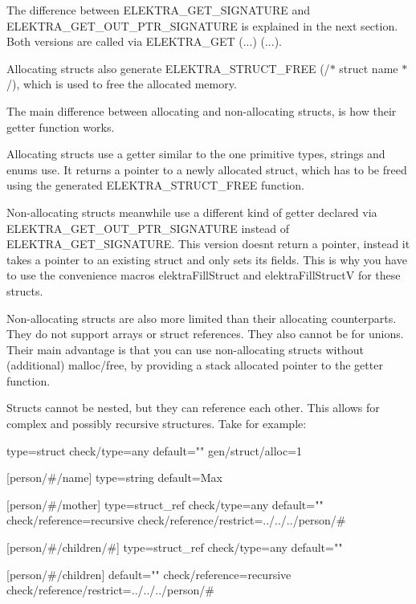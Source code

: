 The difference between {\ttfamily E\+L\+E\+K\+T\+R\+A\+\_\+\+G\+E\+T\+\_\+\+S\+I\+G\+N\+A\+T\+U\+RE} and {\ttfamily E\+L\+E\+K\+T\+R\+A\+\_\+\+G\+E\+T\+\_\+\+O\+U\+T\+\_\+\+P\+T\+R\+\_\+\+S\+I\+G\+N\+A\+T\+U\+RE} is explained in the next section. Both versions are called via {\ttfamily E\+L\+E\+K\+T\+R\+A\+\_\+\+G\+ET (...) (...)}.

Allocating structs also generate {\ttfamily E\+L\+E\+K\+T\+R\+A\+\_\+\+S\+T\+R\+U\+C\+T\+\_\+\+F\+R\+EE (/$\ast$ struct name $\ast$/)}, which is used to free the allocated memory.

The main difference between allocating and non-\/allocating structs, is how their getter function works.

Allocating structs use a getter similar to the one primitive types, strings and enums use. It returns a pointer to a newly allocated struct, which has to be freed using the generated {\ttfamily E\+L\+E\+K\+T\+R\+A\+\_\+\+S\+T\+R\+U\+C\+T\+\_\+\+F\+R\+EE} function.

Non-\/allocating structs meanwhile use a different kind of getter declared via {\ttfamily E\+L\+E\+K\+T\+R\+A\+\_\+\+G\+E\+T\+\_\+\+O\+U\+T\+\_\+\+P\+T\+R\+\_\+\+S\+I\+G\+N\+A\+T\+U\+RE} instead of {\ttfamily E\+L\+E\+K\+T\+R\+A\+\_\+\+G\+E\+T\+\_\+\+S\+I\+G\+N\+A\+T\+U\+RE}. This version doesn\textquotesingle{}t return a pointer, instead it takes a pointer to an existing struct and only sets its fields. This is why you have to use the convenience macros {\ttfamily elektra\+Fill\+Struct} and {\ttfamily elektra\+Fill\+StructV} for these structs.

Non-\/allocating structs are also more limited than their allocating counterparts. They do not support arrays or struct references. They also cannot be for unions. Their main advantage is that you can use non-\/allocating structs without (additional) {\ttfamily malloc}/{\ttfamily free}, by providing a stack allocated pointer to the getter function.

Structs cannot be nested, but they can reference each other. This allows for complex and possibly recursive structures. Take for example\+:


\begin{DoxyCode}
[person/#]
type=struct
check/type=any
default=""
gen/struct/alloc=1

[person/#/name]
type=string
default=Max

[person/#/mother]
type=struct\_ref
check/type=any
default=""
check/reference=recursive
check/reference/restrict=../../../person/#

[person/#/children/#]
type=struct\_ref
check/type=any
default=""

[person/#/children]
default=""
check/reference=recursive
check/reference/restrict=../../../person/#
\end{DoxyCode}


